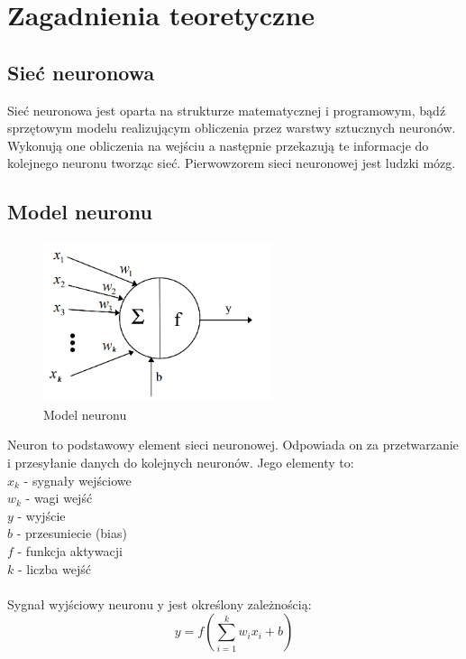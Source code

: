 \documentclass[a4paper, openright, twoside,11pt]{article}
\begin{document}
    \section{Zagadnienia teoretyczne}
    \subsection{Sieć neuronowa}
    Sieć neuronowa jest oparta na strukturze matematycznej i programowym, bądź sprzętowym modelu realizującym obliczenia przez warstwy sztucznych neuronów. Wykonują one obliczenia na wejściu a następnie przekazują te informacje do kolejnego neuronu tworząc sieć. Pierwowzorem sieci neuronowej jest ludzki mózg. 
    
    \subsection{Model neuronu}
    \begin{figure}[h]
        \centering
        \includegraphics[width=0.6\textwidth]{Grafika/neuron.png}
        \caption{Model neuronu}
        \label{fig:neuron}
    \end{figure}
    
    Neuron to podstawowy element sieci neuronowej. Odpowiada on za przetwarzanie i przesyłanie danych do kolejnych neuronów. Jego elementy to:\\[0.1cm]
    $x_k$ - sygnały wejściowe\\
    $w_k$ - wagi wejść\\
    $y$ - wyjście\\
    $b$ - przesuniecie (bias)\\
    $f$ - funkcja aktywacji\\
    $k$ - liczba wejść\\
    \\[0.5cm]
    Sygnał wyjściowy neuronu y jest określony zależnością:
    \begin{equation} \label{funkcja aktywacji}
    y = f(\sum_{i=1}^k w_i x_i + b)
    \end{equation}
    
\end{document}
